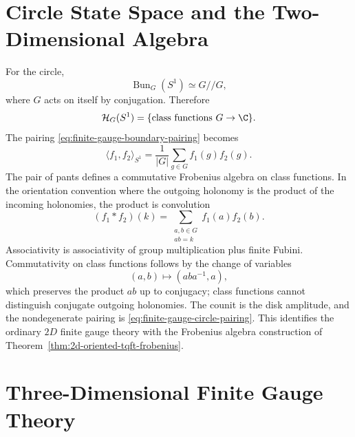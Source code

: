 \section{Circle State Space and the Two-Dimensional Algebra}

For the circle,
\[
  \operatorname{Bun}_G(S^1)\simeq G//G,
\]
where \(G\) acts on itself by conjugation.  Therefore
\begin{equation}
  \mathcal H_G(S^1)
  =
  \{\hbox{class functions }G\to\C\}.
  \label{eq:finite-gauge-circle-class-functions}
\end{equation}
The pairing \eqref{eq:finite-gauge-boundary-pairing} becomes
\begin{equation}
  \langle f_1,f_2\rangle_{S^1}
  =
  \frac{1}{|G|}\sum_{g\in G} f_1(g)f_2(g).
  \label{eq:finite-gauge-circle-pairing}
\end{equation}
The pair of pants defines a commutative Frobenius algebra on class
functions.  In the orientation convention where the outgoing holonomy is the
product of the incoming holonomies, the product is convolution
\begin{equation}
  (f_1*f_2)(k)
  =
  \sum_{\substack{a,b\in G\\ab=k}}
  f_1(a)f_2(b).
  \label{eq:finite-gauge-class-function-convolution}
\end{equation}
Associativity is associativity of group multiplication plus finite Fubini.
Commutativity on class functions follows by the change of variables
\[
  (a,b)\mapsto (aba^{-1},a),
\]
which preserves the product \(ab\) up to conjugacy; class functions cannot
distinguish conjugate outgoing holonomies.  The counit is the disk amplitude,
and the nondegenerate pairing is \eqref{eq:finite-gauge-circle-pairing}.
This identifies the ordinary \(2D\) finite gauge theory with the Frobenius
algebra construction of
Theorem~\ref{thm:2d-oriented-tqft-frobenius}.

\section{Three-Dimensional Finite Gauge Theory}

